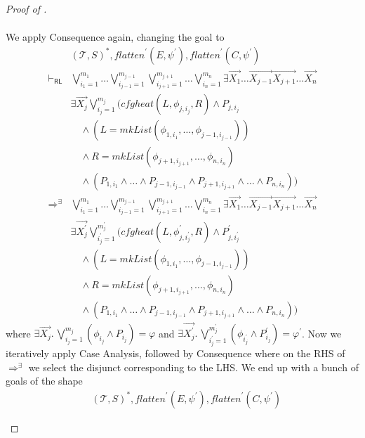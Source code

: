 \documentclass{article}
\newcommand{\RL}{\mathsf{RL}}
\begin{document}
\begin{proof}[Proof of ]
\begin{enumerate}
\begin{align*}
    \end{align*}
    We apply Consequence again, changing the goal to
    \begin{align*}
        & (\mathcal{T}, S)^*, \mathit{flatten}^\prime(E, \psi^\prime), \mathit{flatten}^\prime(C, \psi^\prime)
        \\ \vdash_\RL &
        \bigvee_{i_1=1}^{m_1} \ldots \bigvee_{i_{j-1}=1}^{m_{j-1}}
        \bigvee_{i_{j+1}=1}^{m_{j+1}} \ldots \bigvee_{i_n=1}^{m_n}
        \exists \vec{X_1} \ldots \vec{X_{j-1}} \vec{X_{j+1}} \ldots \vec{X_n}
        \\& \exists \vec{X_j} \bigvee_{i_j=1}^{m_j} (\mathit{cfgheat}(L, \phi_{j, i_j}, R) \land P_{j, i_j}
        \\&\quad \land (L = \mathit{mkList}(\phi_{1, i_1}, \ldots, \phi_{j-1, i_{j-1}}))
        \\&\quad \land R = \mathit{mkList}(\phi_{j+1, i_{j+1}}, \ldots, \phi_{n, i_{n}})
        \\&\quad \land (P_{1, i_1} \land \ldots \land P_{j-1, i_{j-1}} \land P_{j+1, i_{j+1}} \land \ldots \land P_{n, i_n}))
        \\ \Rightarrow^\exists &
        \bigvee_{i_1=1}^{m_1} \ldots \bigvee_{i_{j-1}=1}^{m_{j-1}}
        \bigvee_{i_{j+1}=1}^{m_{j+1}} \ldots \bigvee_{i_n=1}^{m_n}
        \exists \vec{X_1} \ldots \vec{X_{j-1}} \vec{X_{j+1}} \ldots \vec{X_n}
        \\& \exists \vec{X^\prime_j} \bigvee_{i^\prime_j=1}^{m^\prime_j} (\mathit{cfgheat}(L, \phi^\prime_{j, i^\prime_j}, R) \land P^\prime_{j, i^\prime_j}
        \\&\quad \land (L = \mathit{mkList}(\phi_{1, i_1}, \ldots, \phi_{j-1, i_{j-1}}))
        \\&\quad \land R = \mathit{mkList}(\phi_{j+1, i_{j+1}}, \ldots, \phi_{n, i_{n}})
        \\&\quad \land (P_{1, i_1} \land \ldots \land P_{j-1, i_{j-1}} \land P_{j+1, i_{j+1}} \land \ldots \land P_{n, i_n}))
    \end{align*}
    where $\exists \vec{X_j}.\, \bigvee_{i_j = 1}^{m_j} (\phi_{i_j} \land P_{i_j}) = \varphi $
    and $\exists \vec{X_j^\prime}.\, \bigvee_{i_j^\prime = 1}^{m_j^\prime} (\phi_{i_j^\prime} \land P_{i_j}^\prime) = \varphi^\prime$.
    Now we iteratively apply Case Analysis, followed by Consequence where on the RHS of $\Rightarrow^\exists$ we select the disjunct corresponding to the LHS.
    We end up with a bunch of goals of the shape
    \begin{align*}
        & (\mathcal{T}, S)^*, \mathit{flatten}^\prime(E, \psi^\prime), \mathit{flatten}^\prime(C, \psi^\prime)

\end{align*}
\end{enumerate}
\end{proof}
\end{document}
